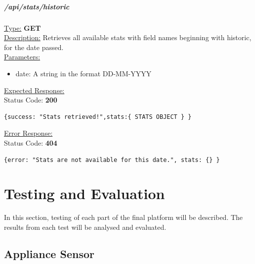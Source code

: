 \documentclass[preprint,12pt,3p]{elsarticle}
\newcommand{\forceindent}{\leavevmode{\parindent=1em\indent}}
\begin{document}
\subparagraph*{/api/stats/historic}
\underline{Type:} \textbf{GET}\\

\underline{Description:} Retrieves all available stats with field names beginning with historic, for the date passed.\\

\underline{Parameters:}
\begin{itemize}
\item date: A string in the format DD-MM-YYYY
\end{itemize}

\underline{Expected Response:}\\[5pt]
\forceindent Status Code: \textbf{200} \\
\begin{verbatim}
{success: "Stats retrieved!",stats:{ STATS OBJECT } }
\end{verbatim}
\underline{Error Response:}\\[5pt]
\forceindent Status Code: \textbf{404} \\
\begin{verbatim}
{error: "Stats are not available for this date.", stats: {} }
\end{verbatim}

\clearpage

\section{Testing and Evaluation}
In this section, testing of each part of the final platform will be described. The results from each test will be analysed and evaluated.
\subsection{Appliance Sensor}
\end{document}
